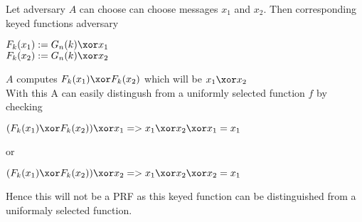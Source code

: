 Let adversary $A$ can choose can choose messages $x_1$ and $x_2$. Then corresponding keyed functions adversary
\begin{center}
    $ F_k(x_1) := G_n(k) \xor x_1 $ \\
    $ F_k(x_2) := G_n(k) \xor x_2 $ \\
\end{center}

$A$ computes $ F_k(x_1) \xor F_k(x_2) $ which will be $ x_1 \xor x_2 $ \\

With this A can easily distingush from a uniformly selected function $f$ by checking 

\begin{center}
    $ (F_k(x_1) \xor F_k(x_2) ) \xor x_1 => x_1 \xor x_2 \xor x_1  = x_1$
\end{center}

or 
\begin{center}
    $ (F_k(x_1) \xor F_k(x_2) ) \xor x_2 => x_1 \xor x_2 \xor x_2  = x_1$
\end{center}

Hence this will not be a PRF as this keyed function can be distinguished from a uniformaly selected function.









